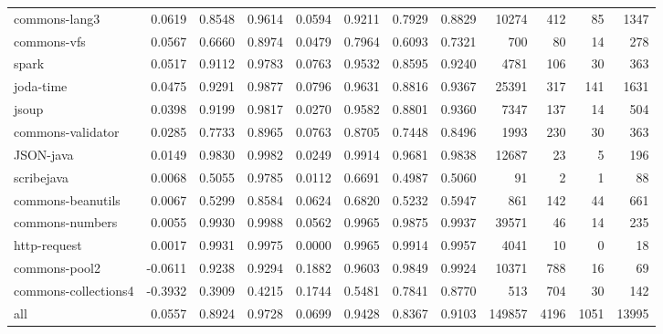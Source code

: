 \begin{table*}
\begin{tabular}{lrrrrrrrrrrr}
          commons-lang3 &      0.0619 &  0.8548 &     0.9614 &     0.0594 &  0.9211 &     0.7929 &   0.8829 &   10274 &   412 &    85 &   1347 \\
            commons-vfs &      0.0567 &  0.6660 &     0.8974 &     0.0479 &  0.7964 &     0.6093 &   0.7321 &     700 &    80 &    14 &    278 \\
                  spark &      0.0517 &  0.9112 &     0.9783 &     0.0763 &  0.9532 &     0.8595 &   0.9240 &    4781 &   106 &    30 &    363 \\
              joda-time &      0.0475 &  0.9291 &     0.9877 &     0.0796 &  0.9631 &     0.8816 &   0.9367 &   25391 &   317 &   141 &   1631 \\
                  jsoup &      0.0398 &  0.9199 &     0.9817 &     0.0270 &  0.9582 &     0.8801 &   0.9360 &    7347 &   137 &    14 &    504 \\
      commons-validator &      0.0285 &  0.7733 &     0.8965 &     0.0763 &  0.8705 &     0.7448 &   0.8496 &    1993 &   230 &    30 &    363 \\
              JSON-java &      0.0149 &  0.9830 &     0.9982 &     0.0249 &  0.9914 &     0.9681 &   0.9838 &   12687 &    23 &     5 &    196 \\
             scribejava &      0.0068 &  0.5055 &     0.9785 &     0.0112 &  0.6691 &     0.4987 &   0.5060 &      91 &     2 &     1 &     88 \\
      commons-beanutils &      0.0067 &  0.5299 &     0.8584 &     0.0624 &  0.6820 &     0.5232 &   0.5947 &     861 &   142 &    44 &    661 \\
        commons-numbers &      0.0055 &  0.9930 &     0.9988 &     0.0562 &  0.9965 &     0.9875 &   0.9937 &   39571 &    46 &    14 &    235 \\
           http-request &      0.0017 &  0.9931 &     0.9975 &     0.0000 &  0.9965 &     0.9914 &   0.9957 &    4041 &    10 &     0 &     18 \\
          commons-pool2 &     -0.0611 &  0.9238 &     0.9294 &     0.1882 &  0.9603 &     0.9849 &   0.9924 &   10371 &   788 &    16 &     69 \\
   commons-collections4 &     -0.3932 &  0.3909 &     0.4215 &     0.1744 &  0.5481 &     0.7841 &   0.8770 &     513 &   704 &    30 &    142 \\
                    all &      0.0557 &  0.8924 &     0.9728 &     0.0699 &  0.9428 &     0.8367 &   0.9103 &  149857 &  4196 &  1051 &  13995 \\
\bottomrule
\end{tabular}
\end{table*}
